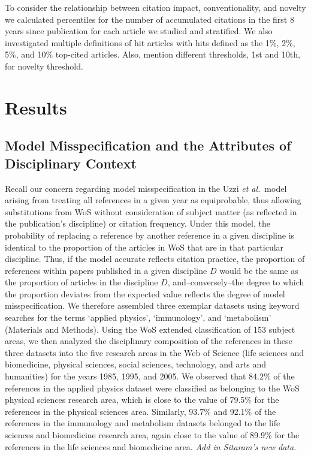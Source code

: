 \documentclass[NETN]{stjour}
\begin{document}
To consider the relationship between citation impact, conventionality, and novelty we calculated percentiles for the number of accumulated citations in the first 8 years since publication for each article we studied and stratified. We also investigated multiple definitions of hit articles with hits defined as the 1\%, 2\%, 5\%, and 10\% top-cited articles.  Also, mention different thresholds, 1st and 10th, for novelty threshold.

\section{Results}

\subsection{Model Misspecification and the Attributes of Disciplinary Context} 
Recall our concern regarding model misspecification  in the Uzzi {\em et al.}~model arising from treating all references in a given year as equiprobable, thus allowing substitutions from WoS without consideration of subject matter (as reflected in the publication's discipline) or citation frequency.
Under this model, the probability of replacing a reference by another reference in a given discipline is identical to the proportion of the articles in WoS that are in that particular discipline.
Thus, if the model accurate reflects citation practice, the proportion of references within papers published in a given discipline $D$ would be the same as the proportion of articles in the discipline $D$, and--conversely--the degree to which the proportion deviates from the expected value reflects the degree of model misspecification.
We therefore  assembled three exemplar datasets using keyword searches for the terms `applied physics', `immunology', and `metabolism' (Materials and Methods). 
Using the WoS extended classification of 153 subject areas, we then analyzed the disciplinary composition of the references in these three datasets into the five research areas in the Web of Science (life sciences and biomedicine, physical sciences, social sciences, technology, and arts and humanities) for the years 1985, 1995, and 2005. We observed that 84.2\% of the references in the applied physics dataset were classified as belonging to the WoS physical sciences research area, which is close to the value of 79.5\% for the references in the physical sciences area. Similarly, 93.7\% and 92.1\% of the references in the immunology and metabolism datasets belonged to the life sciences and biomedicine research area, again close to the value of 89.9\% for the references in the life sciences and biomedicine area. \emph{Add in Sitaram's new data}. 
\end{document}
